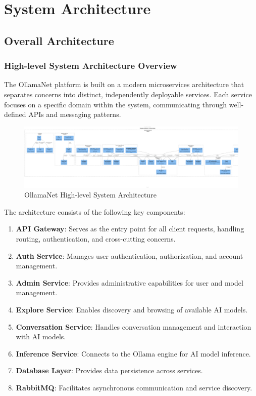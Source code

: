 \def\chapdir{./Chapter04}

\chapter{System Architecture} \label{ch:system-architecture}

\section{Overall Architecture}

\subsection{High-level System Architecture Overview}

The OllamaNet platform is built on a modern microservices architecture that separates concerns into distinct, independently deployable services. Each service focuses on a specific domain within the system, communicating through well-defined APIs and messaging patterns.

\begin{figure}[p]
    \centering
    \includegraphics[width=\textwidth]{./Chapter04/figures/OllamaNet_Architecture.png}
    \caption{OllamaNet High-level System Architecture}
    \label{fig:system-architecture}
\end{figure}
\clearpage

The architecture consists of the following key components:

\begin{enumerate}
   \item \textbf{API Gateway}: Serves as the entry point for all client requests, handling routing, authentication, and cross-cutting concerns.
   \item \textbf{Auth Service}: Manages user authentication, authorization, and account management.
   \item \textbf{Admin Service}: Provides administrative capabilities for user and model management.
   \item \textbf{Explore Service}: Enables discovery and browsing of available AI models.
   \item \textbf{Conversation Service}: Handles conversation management and interaction with AI models.
   \item \textbf{Inference Service}: Connects to the Ollama engine for AI model inference.
   \item \textbf{Database Layer}: Provides data persistence across services.
   \item \textbf{RabbitMQ}: Facilitates asynchronous communication and service discovery.
\end{enumerate}

